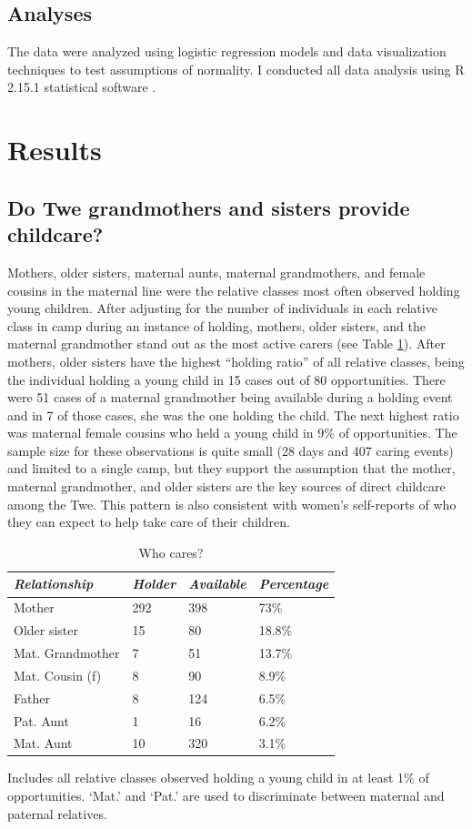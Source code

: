 \documentclass[10pt]{article}
\begin{document}
\subsection{Analyses}
The data were analyzed using logistic regression models and data visualization techniques to test assumptions of normality.  I conducted all data analysis using R 2.15.1 statistical software \citep{rdevcore}.

\section{Results}

\subsection{Do Twe grandmothers and sisters provide childcare?}  
Mothers, older sisters, maternal aunts, maternal grandmothers, and female cousins in the maternal line were the relative classes most often observed holding young children.  After adjusting for the number of individuals in each relative class in camp during an instance of holding, mothers, older sisters, and the maternal grandmother stand out as the most active carers (see Table \ref{tab:whocares}).  After mothers, older sisters have the highest ``holding ratio'' of all relative classes, being the individual holding a young child in 15 cases out of 80 opportunities.  There were 51 cases of a maternal grandmother being available during a holding event and in 7 of those cases, she was the one holding the child.  The next highest ratio was maternal female cousins who held a young child in 9\% of opportunities.  The sample size for these observations is quite small (28 days and 407 caring events) and limited to a single camp, but they support the assumption that the mother, maternal grandmother, and older sisters are the key sources of direct childcare among the Twe.  This pattern is also consistent with women's self-reports of who they can expect to help take care of their children. 

\begin{table}[!tb]
\caption {Who cares? \label{tab:whocares} }
  \centering
  \begin{tabular}{| l | l | l | l |} 
  	\hline
	\emph{Relationship} & \emph{Holder} & \emph{Available} & \emph{Percentage}\\ \hline
	Mother & 292 & 398 & 73\%\\	
	Older sister & 15 & 80 & 18.8\%\\	
	Mat. Grandmother & 7 & 51 & 13.7\%\\	
	Mat. Cousin (f) & 8 & 90 & 8.9\%\\
	Father & 8 & 124 & 6.5\%\\
	Pat. Aunt & 1 & 16 & 6.2\%\\
	Mat. Aunt & 10 & 320 & 3.1\%\\ \hline
  \end{tabular}    
  
{Includes all relative classes observed holding a young child in at least 1\% of opportunities. `Mat.' and `Pat.' are used to discriminate between maternal and paternal relatives.}
\end{table}
\end{document}
